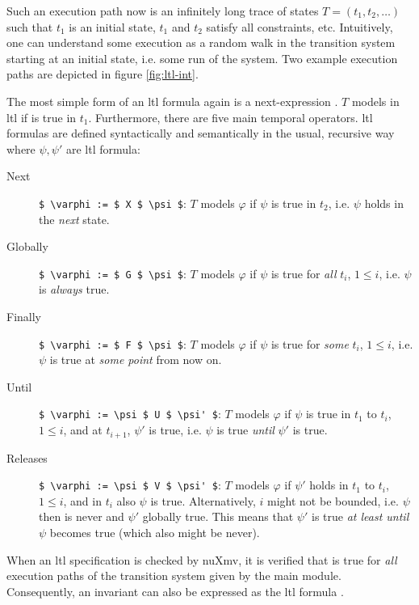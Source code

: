 Such an execution path now is an infinitely long trace of states $ T = (t_1, t_2, \dots) $ such that $ t_1 $ is an initial state, $ t_1 $ and $ t_2 $ satisfy all  constraints, etc.
Intuitively, one can understand some execution as a random walk in the transition system starting at an initial state, i.e. some run of the system.
Two example execution paths are depicted in figure \ref{fig:ltl-int}.

The most simple form of an \gls{ltl} formula again is a next-expression .
$ T $ models  in \gls{ltl} if  is true in $ t_1 $.
Furthermore, there are five main temporal operators.
\gls{ltl} formulas are defined syntactically and semantically in the usual, recursive way where $ \psi, \psi' $ are \gls{ltl} formula:
\begin{description}
    \item[Next] \lstinline[language=smv,mathescape=true]{$ \varphi := $ X $ \psi $}: $ T $ models $ \varphi $ if $ \psi $ is true in $ t_2 $, i.e. $ \psi $ holds in the \textit{next} state.
    \item[Globally] \lstinline[language=smv,mathescape=true]{$ \varphi := $ G $ \psi $}: $ T $ models $ \varphi $ if $ \psi $ is true for \textit{all} $ t_i $, $ 1 \leq i $, i.e. $ \psi $ is \textit{always} true.
    \item[Finally] \lstinline[language=smv,mathescape=true]{$ \varphi := $ F $ \psi $}: $ T $ models $ \varphi $ if $ \psi $ is true for \textit{some} $ t_i $, $ 1 \leq i $, i.e. $ \psi $ is true at \textit{some point} from now on.
    \item[Until] \lstinline[language=smv,mathescape=true]{$ \varphi := \psi $ U $ \psi' $}: $ T $ models $ \varphi $ if $ \psi $ is true in $ t_1 $ to $ t_i $, $ 1 \leq i $, and at $ t_{i + 1} $, $ \psi' $ is true, i.e. $ \psi $ is true \textit{until} $ \psi' $ is true.
    \item[Releases] \lstinline[language=smv,mathescape=true]{$ \varphi := \psi $ V $ \psi' $}: $ T $ models $ \varphi $ if $ \psi' $ holds in $ t_1 $ to $ t_i $, $ 1 \leq i $, and in $ t_i $ also $ \psi $ is true.
    Alternatively, $ i $ might not be bounded, i.e. $ \psi $ then is never and $ \psi' $ globally true.
    This means that $ \psi' $ is true \textit{at least until} $ \psi $ becomes true (which also might be never).
\end{description}

When an \gls{ltl} specification  is checked by nuXmv, it is verified that  is true for \textit{all} execution paths of the transition system given by the main module.
Consequently, an invariant  can also be expressed as the \gls{ltl} formula .

